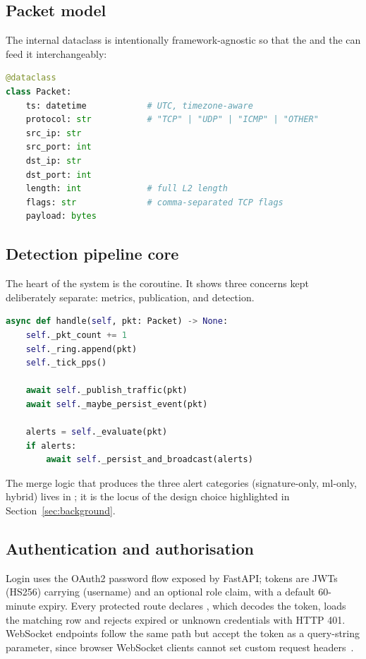 \subsection{Packet model}

The internal  dataclass is intentionally framework-agnostic
so that the  and the  can feed
it interchangeably:
\begin{lstlisting}[language=Python,caption={Internal packet representation}]
@dataclass
class Packet:
    ts: datetime            # UTC, timezone-aware
    protocol: str           # "TCP" | "UDP" | "ICMP" | "OTHER"
    src_ip: str
    src_port: int
    dst_ip: str
    dst_port: int
    length: int             # full L2 length
    flags: str              # comma-separated TCP flags
    payload: bytes
\end{lstlisting}

\subsection{Detection pipeline core}

The heart of the system is the  coroutine. It
shows three concerns kept deliberately separate: metrics, publication,
and detection.
\begin{lstlisting}[language=Python,caption={Dispatcher entry point (excerpt)}]
async def handle(self, pkt: Packet) -> None:
    self._pkt_count += 1
    self._ring.append(pkt)
    self._tick_pps()

    await self._publish_traffic(pkt)
    await self._maybe_persist_event(pkt)

    alerts = self._evaluate(pkt)
    if alerts:
        await self._persist_and_broadcast(alerts)
\end{lstlisting}

The merge logic that produces the three alert categories
(signature-only, ml-only, hybrid) lives in ; it is the
locus of the design choice highlighted in Section~\ref{sec:background}.

\subsection{Authentication and authorisation}

Login uses the OAuth2 password flow exposed by FastAPI; tokens are
JWTs (HS256) carrying  (username) and an optional role claim,
with a default 60-minute expiry. Every protected route declares
, which decodes the token, loads the
matching  row and rejects expired or unknown credentials
with HTTP 401. WebSocket endpoints follow the same path but accept the
token as a query-string parameter, since browser WebSocket clients
cannot set custom request headers~\cite{ietf6455}.

